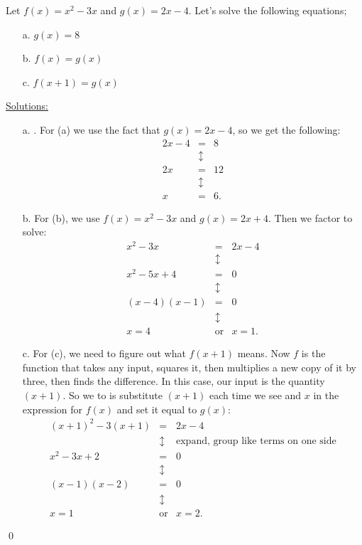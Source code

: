 \par 

\begin{eg} Let $f(x) = x^2-3x$ and $g(x) = 2x-4$. Let's solve the following equations;
\begin{enumerate}
\item[a.] $g(x) = 8$
\item[b.] $f(x) = g(x)$
\item[c.] $f(x+1) = g(x)$
\end{enumerate}
\underline{Solutions:}
\begin{enumerate}
\item[a.] . For (a) we use the fact that $g(x) = 2x-4$, so  we get the following:
\begin{eqnarray*}
2x-4 & = & 8\\
& \updownarrow &\\
2x& = & 12\\ 
& \updownarrow &\\
x& =& 6.
\end{eqnarray*}
\item[b.] For (b), we use $f(x) = x^2-3x$ and $g(x) = 2x+4$.  Then we factor to solve: 
\begin{eqnarray*}
x^2 - 3x  & = & 2x-4\\
& \updownarrow & \\
x^2-5x+4 & = & 0\\
& \updownarrow & \\
(x-4)(x-1) & = & 0\\
& \updownarrow & \\
x=4 & \mbox{or} & x=1.
\end{eqnarray*}
\item[c.] For (c), we need to figure out what $f(x+1)$ means.  Now $f$ is the function that takes any input, squares it, then  multiplies a new copy of it by three, then finds the difference. In this case, our input is the quantity $(x+1)$. So we to is substitute $(x+1)$ each time we see and $x$ in the expression for $f(x)$ and set it equal to $g(x)$:
\begin{eqnarray*}
(x+1)^2 - 3(x+1) & = & 2x-4\\ 
& \updownarrow & \mbox{expand, group like terms on one side}\\
x^2-3x+2 & = & 0\\
& \updownarrow & \\
(x-1)(x-2) & = & 0\\
& \updownarrow & \\
x=1 & \mbox{or} & x=2.
\end{eqnarray*}
\end{enumerate}
\qed \end{eg}

